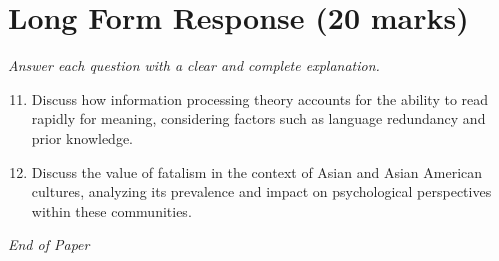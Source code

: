 \documentclass[12pt]{article}
\begin{document}
\section*{Long Form Response (20 marks)}
\textit{Answer each question with a clear and complete explanation.}
\begin{enumerate}[label=\arabic*.]
\setcounter{enumi}{10}
\item Discuss how information processing theory accounts for the ability to read rapidly for meaning, considering factors such as language redundancy and prior knowledge.
\item Discuss the value of fatalism in the context of Asian and Asian American cultures, analyzing its prevalence and impact on psychological perspectives within these communities.
\end{enumerate}

\vfill
\noindent\textit{End of Paper}
\end{document}
